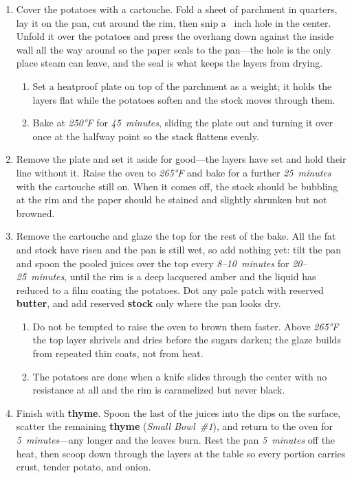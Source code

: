 \documentclass[11pt,letterpaper]{article}
\begin{document}
\begin{enumerate}
    \item Cover the potatoes with a cartouche. Fold a sheet of parchment in quarters, lay it on the pan, cut around the rim, then snip a ~inch hole in the center. Unfold it over the potatoes and press the overhang down against the inside wall all the way around so the paper seals to the pan---the hole is the only place steam can leave, and the seal is what keeps the layers from drying.
\begin{enumerate}
    \item Set a heatproof plate on top of the parchment as a weight; it holds the layers flat while the potatoes soften and the stock moves through them.
    \item Bake at \textit{250°F} for \textit{45~minutes}, sliding the plate out and turning it over once at the halfway point so the stack flattens evenly.
\end{enumerate}

    \item Remove the plate and set it aside for good---the layers have set and hold their line without it. Raise the oven to \textit{265°F} and bake for a further \textit{25~minutes} with the cartouche still on. When it comes off, the stock should be bubbling at the rim and the paper should be stained and slightly shrunken but not browned.

    \item Remove the cartouche and glaze the top for the rest of the bake. All the fat and stock have risen and the pan is still wet, so add nothing yet: tilt the pan and spoon the pooled juices over the top every \textit{8--10~minutes} for \textit{20--25~minutes}, until the rim is a deep lacquered amber and the liquid has reduced to a film coating the potatoes. Dot any pale patch with reserved \textbf{butter}, and add reserved \textbf{stock} only where the pan looks dry.
\begin{enumerate}
    \item Do not be tempted to raise the oven to brown them faster. Above \textit{265°F} the top layer shrivels and dries before the sugars darken; the glaze builds from repeated thin coats, not from heat.
    \item The potatoes are done when a knife slides through the center with no resistance at all and the rim is caramelized but never black.
\end{enumerate}

    \item Finish with \textbf{thyme}. Spoon the last of the juices into the dips on the surface, scatter the remaining \textbf{thyme} (\textit{Small Bowl~\#1}), and return to the oven for \textit{5~minutes}---any longer and the leaves burn. Rest the pan \textit{5~minutes} off the heat, then scoop down through the layers at the table so every portion carries crust, tender potato, and onion.
\end{enumerate}
\end{document}
